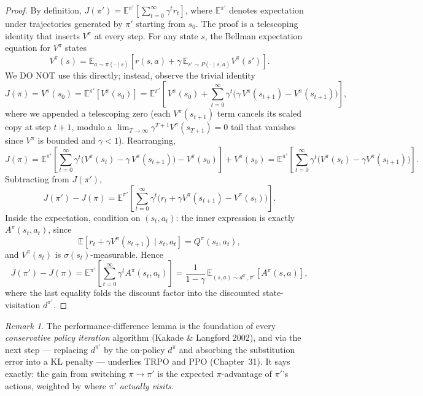 \documentclass[11pt]{article}
\theoremstyle{remark}
\newtheorem{remark}[theorem]{Remark}
\begin{document}
\begin{proof}
By definition, $J(\pi') = \mathbb{E}^{\pi'}\!\left[\sum_{t=0}^\infty \gamma^t r_t\right]$, where $\mathbb{E}^{\pi'}$ denotes expectation under trajectories generated by $\pi'$ starting from $s_0$. The proof is a telescoping identity that inserts $V^\pi$ at every step. For any state $s$, the Bellman expectation equation for $V^\pi$ states
\[
  V^\pi(s) = \mathbb{E}_{a \sim \pi(\cdot \mid s)}\!\left[ r(s, a) + \gamma\, \mathbb{E}_{s' \sim P(\cdot \mid s, a)} V^\pi(s') \right].
\]
We DO NOT use this directly; instead, observe the trivial identity
\[
  J(\pi) = V^\pi(s_0) = \mathbb{E}^{\pi'}[V^\pi(s_0)] = \mathbb{E}^{\pi'}\!\left[\,V^\pi(s_0) + \sum_{t=0}^\infty \gamma^t \bigl(\gamma\, V^\pi(s_{t+1}) - V^\pi(s_{t+1})\bigr)\right],
\]
where we appended a telescoping zero (each $V^\pi(s_{t+1})$ term cancels its scaled copy at step $t+1$, modulo a $\lim_{T\to\infty} \gamma^{T+1} V^\pi(s_{T+1}) = 0$ tail that vanishes since $V^\pi$ is bounded and $\gamma < 1$). Rearranging,
\[
  J(\pi) = \mathbb{E}^{\pi'}\!\left[\sum_{t=0}^\infty \gamma^t \bigl(V^\pi(s_t) - \gamma\, V^\pi(s_{t+1})\bigr) - V^\pi(s_0)\right] + V^\pi(s_0) = \mathbb{E}^{\pi'}\!\left[\sum_{t=0}^\infty \gamma^t \bigl(V^\pi(s_t) - \gamma V^\pi(s_{t+1})\bigr)\right].
\]
Subtracting from $J(\pi')$,
\[
  J(\pi') - J(\pi) = \mathbb{E}^{\pi'}\!\left[\sum_{t=0}^\infty \gamma^t \bigl(r_t + \gamma V^\pi(s_{t+1}) - V^\pi(s_t)\bigr)\right].
\]
Inside the expectation, condition on $(s_t, a_t)$: the inner expression is exactly $A^\pi(s_t, a_t)$, since
\[
  \mathbb{E}\!\left[r_t + \gamma V^\pi(s_{t+1}) \mid s_t, a_t\right] = Q^\pi(s_t, a_t),
\]
and $V^\pi(s_t)$ is $\sigma(s_t)$-measurable. Hence
\[
  J(\pi') - J(\pi) = \mathbb{E}^{\pi'}\!\left[\sum_{t=0}^\infty \gamma^t A^\pi(s_t, a_t)\right] = \frac{1}{1-\gamma} \, \mathbb{E}_{(s,a) \sim d^{\pi'}, \pi'}\!\left[A^\pi(s, a)\right],
\]
where the last equality folds the discount factor into the discounted state-visitation $d^{\pi'}$. \qedhere
\end{proof}

\begin{remark}
The performance-difference lemma is the foundation of every \emph{conservative policy iteration} algorithm (Kakade \& Langford 2002), and via the next step --- replacing $d^{\pi'}$ by the on-policy $d^\pi$ and absorbing the substitution error into a KL penalty --- underlies TRPO and PPO (Chapter~31). It says exactly: the gain from switching $\pi \to \pi'$ is the expected $\pi$-advantage of $\pi'$'s actions, weighted by where $\pi'$ \emph{actually visits}.
\end{remark}
\end{document}
